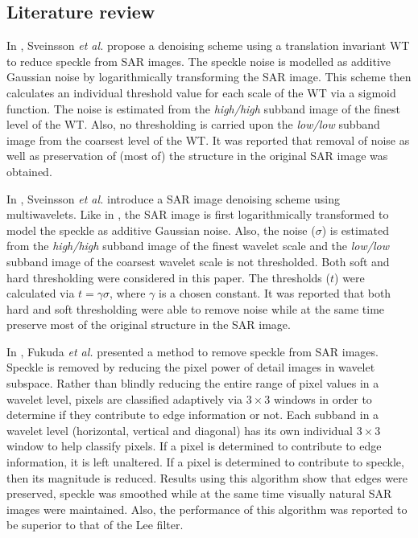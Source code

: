 \documentclass[12pt]{report}
\begin{document}
	
\subsection{Literature review}	
	
In \cite{sveinssonTI}, Sveinsson \emph{et al.} propose a denoising scheme using a
translation invariant WT to reduce speckle from SAR images. The
speckle noise is modelled as additive Gaussian noise by logarithmically transforming
the SAR image. 
This scheme then calculates an individual threshold value for each scale of the 
WT via a sigmoid function. The noise is estimated from the 
\emph{high/high} subband image of the finest level of the WT. Also,
no thresholding is carried upon the \emph{low/low} subband image from the coarsest 
level of the WT. It was reported that removal of noise as well as 
preservation of (most of) the structure in the original SAR image was obtained.

In \cite{sveinssonMulti}, Sveinsson \emph{et al.} introduce a SAR image denoising 
scheme using multiwavelets. Like in \cite{sveinssonTI}, the SAR image is first 
logarithmically transformed to model the speckle as additive Gaussian noise. Also,
the noise ($\sigma$) is estimated from the \emph{high/high} subband image of the finest 
wavelet scale and the \emph{low/low} subband image of the coarsest wavelet scale is not 
thresholded. Both soft and hard thresholding were considered in this paper. The thresholds ($t$)
were calculated via $t=\gamma \sigma$, where $\gamma$ is a chosen constant.
It was reported that both hard and soft thresholding were able to remove noise
while at the same time preserve most of the original structure in the SAR image.

In \cite{fukudaSAR, fukudaSAR2}, Fukuda \emph{et al.} presented a method to remove speckle from SAR images.
Speckle is removed by reducing the pixel power of detail images in wavelet subspace. 
Rather than blindly reducing the entire range of pixel values in a wavelet
level, pixels are classified adaptively via $3 \times 3$ windows in order to determine if they contribute to 
edge information or not. Each subband in a wavelet level (horizontal, vertical and diagonal)
has its own individual $3 \times 3$ window to help classify pixels. If a pixel is determined to contribute
to edge information, it is left unaltered. If a pixel is determined to contribute to speckle,
then its magnitude is reduced. Results using this algorithm show that edges were preserved, speckle
was smoothed while at the same time visually natural SAR images were maintained. Also, the performance
of this algorithm was reported to be superior to that of the Lee filter.
\end{document}
